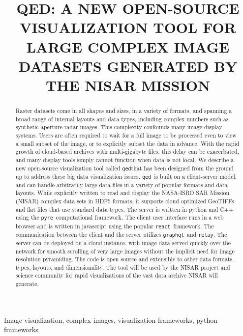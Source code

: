 \documentclass{article}
\title{QED: A NEW OPEN-SOURCE VISUALIZATION TOOL FOR LARGE COMPLEX IMAGE DATASETS
GENERATED BY THE NISAR MISSION}
\def\graphql{{\tt graphql}}
\def\pyre{{\tt pyre}}
\def\qed{{\tt qed}}
\def\react{{\tt react}}
\def\relay{{\tt relay}}
\begin{document}
%
\maketitle
%
\begin{abstract}
Raster datasets come in all shapes and sizes, in a variety of formats, and spanning a
broad range of internal layouts and data types, including complex numbers such as
synthetic aperture radar images. This complexity confounds many image display systems.
Users are often required to wait for a full image to be processed even to view a small
subset of the image, or to explicitly subset the data in advance. With the rapid growth of
cloud-based archives with multi-gigabyte files, this delay can be exacerbated, and many
display tools simply cannot function when data is not local. We describe a new open-source
visualization tool called \qed that has been designed from the ground up to address these
big data visualization issues. \qed\ is built on a client-server model, and can handle
arbitrarily large data files in a variety of popular formats and data layouts. While
explicitly written to read and display the NASA-ISRO SAR Mission (NISAR) complex data sets
in HDF5 formats, it supports cloud optimized GeoTIFFs and flat files that use standard
data types. The server is written in python and C++ using the \pyre\ computational
framework. The client user interface runs in a web browser and is written in javascript
using the popular \react\ framework. The communication between the client and the server
utilizes \graphql\ and \relay. The server can be deployed on a cloud instance, with image
data served quickly over the network for smooth scrolling of very large images without the
implicit need for image resolution pyramiding. The code is open source and extensible to
other data formats, types, layouts, and dimensionality. The tool will be used by the NISAR
project and science community for rapid visualizations of the vast data archive NISAR will
generate.
\end{abstract}
%
\begin{keywords}
Image visualization, complex images, visualization frameworks, python frameworks
\end{keywords}
%
\end{document}
